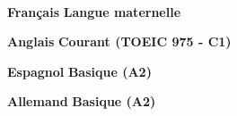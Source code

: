 \documentclass[10pt,a4paper,ragged2e,withhyper]{../AltaCV/altacv}
\begin{document}
\begin{paracol}{2}
  \\

  \divider

  \cvtag{\LaTeX}


  \textcolor{emphasis}{\textbf{Français}} \hfill \textbf{Langue maternelle}\\

  \divider

  \textcolor{emphasis}{\textbf{Anglais}} \hfill \textbf{Courant (TOEIC 975 - C1)}\\

  \divider

  \textcolor{emphasis}{\textbf{Espagnol}} \hfill \textbf{Basique (A2)}\\

  \divider

  \textcolor{emphasis}{\textbf{Allemand}} \hfill \textbf{Basique (A2)}\\

\end{paracol}
\end{document}
